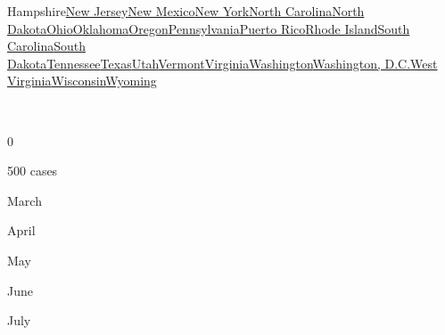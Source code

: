 {Hampshire}\href{https://www.nytimes.com/interactive/2020/us/new-jersey-coronavirus-cases.html}{New
Jersey}\href{https://www.nytimes.com/interactive/2020/us/new-mexico-coronavirus-cases.html}{New
Mexico}\href{https://www.nytimes.com/interactive/2020/us/new-york-coronavirus-cases.html}{New
York}\href{https://www.nytimes.com/interactive/2020/us/north-carolina-coronavirus-cases.html}{North
Carolina}\href{https://www.nytimes.com/interactive/2020/us/north-dakota-coronavirus-cases.html}{North
Dakota}\href{https://www.nytimes.com/interactive/2020/us/ohio-coronavirus-cases.html}{Ohio}\href{https://www.nytimes.com/interactive/2020/us/oklahoma-coronavirus-cases.html}{Oklahoma}\href{https://www.nytimes.com/interactive/2020/us/oregon-coronavirus-cases.html}{Oregon}\href{https://www.nytimes.com/interactive/2020/us/pennsylvania-coronavirus-cases.html}{Pennsylvania}\href{https://www.nytimes.com/interactive/2020/us/puerto-rico-coronavirus-cases.html}{Puerto
Rico}\href{https://www.nytimes.com/interactive/2020/us/rhode-island-coronavirus-cases.html}{Rhode
Island}\href{https://www.nytimes.com/interactive/2020/us/south-carolina-coronavirus-cases.html}{South
Carolina}\href{https://www.nytimes.com/interactive/2020/us/south-dakota-coronavirus-cases.html}{South
Dakota}\href{https://www.nytimes.com/interactive/2020/us/tennessee-coronavirus-cases.html}{Tennessee}\href{https://www.nytimes.com/interactive/2020/us/texas-coronavirus-cases.html}{Texas}\href{https://www.nytimes.com/interactive/2020/us/utah-coronavirus-cases.html}{Utah}\href{https://www.nytimes.com/interactive/2020/us/vermont-coronavirus-cases.html}{Vermont}\href{https://www.nytimes.com/interactive/2020/us/virginia-coronavirus-cases.html}{Virginia}\href{https://www.nytimes.com/interactive/2020/us/washington-coronavirus-cases.html}{Washington}\href{https://www.nytimes.com/interactive/2020/us/washington-dc-coronavirus-cases.html}{Washington,
D.C.}\href{https://www.nytimes.com/interactive/2020/us/west-virginia-coronavirus-cases.html}{West
Virginia}\href{https://www.nytimes.com/interactive/2020/us/wisconsin-coronavirus-cases.html}{Wisconsin}\href{https://www.nytimes.com/interactive/2020/us/wyoming-coronavirus-cases.html}{Wyoming}

~

0

500 cases

March

April

May

June

July

